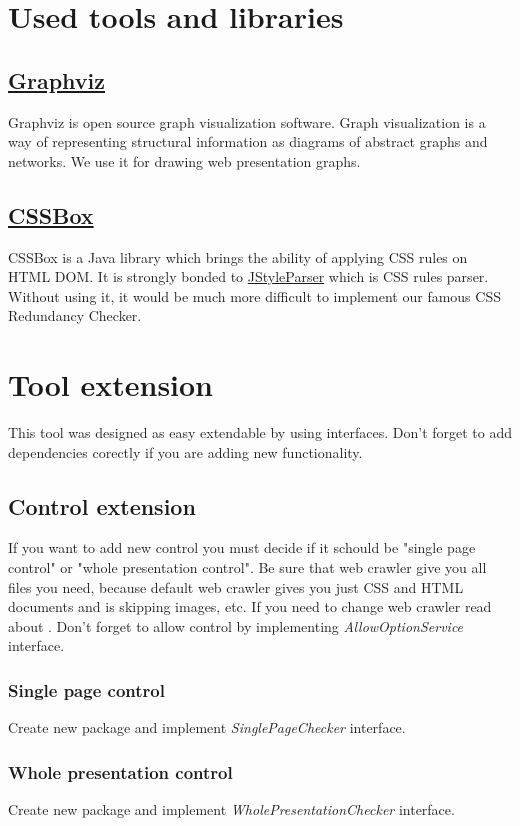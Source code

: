\documentclass[12pt,a4paper]{article}
\begin{document}
\section {Used tools and libraries}
\subsection{\href{http://graphviz.org/}{Graphviz}}
Graphviz is open source graph visualization software. Graph visualization is a way of representing structural information as diagrams of abstract graphs and networks. We use it for drawing web presentation graphs.
\subsection{\href{http://cssbox.sourceforge.net/}{CSSBox}}
CSSBox is a Java library which brings the ability of applying CSS rules on HTML DOM. It is strongly bonded to \href{http://cssbox.sourceforge.net/jstyleparser/}{JStyleParser} which is CSS rules parser. Without using it, it would be much more difficult to implement our famous CSS Redundancy Checker.

\section{Tool extension}
This tool was designed as easy extendable by using interfaces. Don't forget to add dependencies corectly if you are adding new functionality.
\subsection{Control extension}
If you want to add new control you must decide if it schould be "single page control" or "whole presentation control". Be sure that web crawler give you all files you need, because default web crawler gives you just CSS and HTML documents and is skipping  images, etc. If you need to change web crawler read about . Don't forget to allow control by implementing \textit{AllowOptionService} interface.
\subsubsection{Single page control}
Create new package and implement \textit{SinglePageChecker} interface.
\subsubsection{Whole presentation control}
Create new package and implement \textit{WholePresentationChecker} interface.
\end{document}
